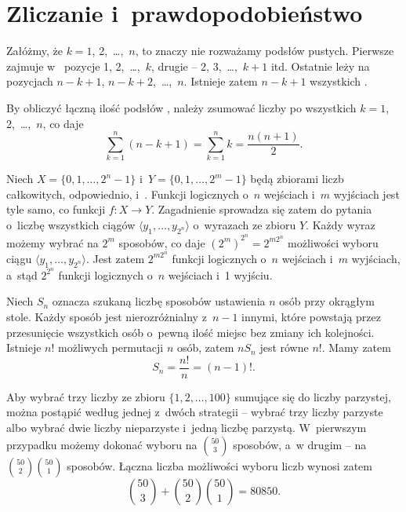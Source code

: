 \chapter{Zliczanie i~prawdopodobieństwo}


\exercise %
Załóżmy, że $k=1$, 2,~\dots,~$n$, to znaczy nie rozważamy podsłów pustych. Pierwsze  zajmuje w~ pozycje 1, 2,~\dots,~$k$, drugie -- 2, 3,~\dots,~$k+1$ itd. Ostatnie  leży na pozycjach $n-k+1$, $n-k+2$,~\dots,~$n$. Istnieje zatem $n-k+1$ wszystkich  .

By obliczyć łączną ilość podsłów , należy zsumować liczby  po wszystkich $k=1$, 2,~\dots,~$n$, co daje
\[
	\sum_{k=1}^n(n-k+1) = \sum_{k=1}^nk = \frac{n(n+1)}{2}.
\]

\exercise %
Niech $X=\{0,1,\dots,2^n-1\}$ i~$Y=\{0,1,\dots,2^m-1\}$ będą zbiorami liczb całkowitych, odpowiednio,  i~. Funkcji logicznych o~$n$ wejściach i~$m$ wyjściach jest tyle samo, co funkcji $f\colon X\to Y$. Zagadnienie sprowadza się zatem do pytania o~liczbę wszystkich ciągów $\langle y_1,\dots,y_{2^n}\!\rangle$ o~wyrazach ze zbioru $Y$. Każdy wyraz możemy wybrać na $2^m$ sposobów, co daje $(2^m)^{2^n}=2^{m2^n}\!$ możliwości wyboru ciągu $\langle y_1,\dots,y_{2^n}\!\rangle$. Jest zatem $2^{m2^n}\!$ funkcji logicznych o~$n$ wejściach i~$m$ wyjściach, a~stąd $2^{2^n}\!$ funkcji logicznych o~$n$ wejściach i~1 wyjściu.

\exercise %
Niech $S_n$ oznacza szukaną liczbę sposobów ustawienia $n$ osób przy okrągłym stole. Każdy sposób jest nierozróżnialny z~$n-1$ innymi, które powstają przez przesunięcie wszystkich osób o~pewną ilość miejsc bez zmiany ich kolejności. Istnieje $n!$ możliwych permutacji $n$ osób, zatem $nS_n$ jest równe $n!$. Mamy zatem
\[
	S_n = \frac{n!}{n} = (n-1)!.
\]

\exercise %
Aby wybrać trzy liczby ze zbioru $\{1,2,\dots,100\}$ sumujące się do liczby parzystej, można postąpić według jednej z~dwóch strategii -- wybrać trzy liczby parzyste albo wybrać dwie liczby nieparzyste i~jedną liczbę parzystą. W~pierwszym przypadku możemy dokonać wyboru na $\binom{50}{3}$ sposobów, a~w drugim -- na $\binom{50}{2}\binom{50}{1}$ sposobów. Łączna liczba możliwości wyboru liczb wynosi zatem
\[
	\binom{50}{3}+\binom{50}{2}\binom{50}{1} = 80850.
\]

